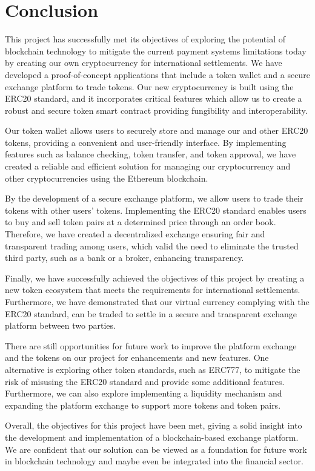 \chapter{Conclusion}
\label{ch:conclusion}


This project has successfully met its objectives of exploring the potential of blockchain technology to mitigate the current
payment systems limitations today by creating our own cryptocurrency for international settlements. We have developed a proof-of-concept
applications that include a token wallet and a secure exchange platform to trade tokens. Our new cryptocurrency is built using the ERC20 standard, and it incorporates critical features which allow us to create a robust and secure token smart contract providing fungibility and interoperability.

Our token wallet allows users to securely store and manage our and other ERC20 tokens, providing
a convenient and user-friendly interface. By implementing features such as balance checking, token transfer,
and token approval, we have created a reliable and efficient solution for managing our cryptocurrency and other cryptocurrencies
using the Ethereum blockchain.

By the development of a secure exchange platform, we allow users to trade their tokens with other users' tokens. Implementing the ERC20 standard enables users to buy and sell token pairs at a determined price through
an order book. Therefore, we have created a decentralized exchange ensuring fair and transparent trading among users, 
which valid the need to eliminate the trusted third party, such as a bank or a broker, enhancing transparency.

Finally, we have successfully achieved the objectives of this project by creating a new token ecosystem that meets the requirements
for international settlements. Furthermore, we have demonstrated that our virtual currency complying with the ERC20 standard, can be traded to settle in a secure and transparent exchange platform between two parties. 

There are still opportunities for future work to improve the platform exchange and the tokens on our project for enhancements and
new features. One alternative is exploring other token standards, such as ERC777, to mitigate the risk of misusing
the ERC20 standard and provide some additional features. Furthermore, we can also explore implementing a liquidity mechanism
and expanding the platform exchange to support more tokens and token pairs.

Overall, the objectives for this project have been met, giving a solid insight into the development and implementation
of a blockchain-based exchange platform. We are confident that our solution can be viewed as a foundation for 
future work in blockchain technology and maybe even be integrated into the financial sector.